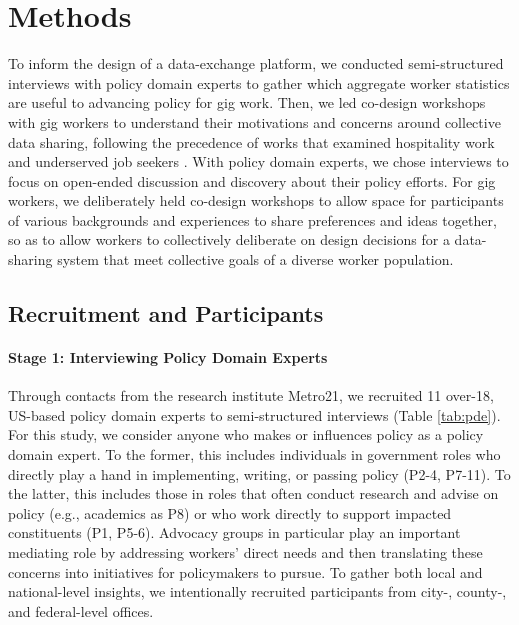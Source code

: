 \section{Methods}\label{h.5sn3xgklbkyx}
To inform the design of a data-exchange platform, we conducted semi-structured interviews with policy domain experts to gather which aggregate worker statistics are useful to advancing policy for gig work. Then, we led co-design workshops with gig workers to understand their motivations and concerns around collective data sharing, {following the precedence of works that examined hospitality work and underserved job seekers \cite{dillahunt2018designing, spektor2023designing}.} {With policy domain experts, we chose interviews to focus on open-ended discussion and discovery about their policy efforts. 
For gig workers, we deliberately held co-design workshops to allow space for participants of various backgrounds and experiences to share preferences and ideas together, so as to allow workers to collectively deliberate on design decisions for a data-sharing system that meet collective goals of a diverse worker population.}
\subsection{Recruitment and Participants}
\label{h.kvn6j5yejjmz}

\paragraph{Stage 1: Interviewing Policy Domain Experts}\label{h.pu0gzew4e1gn}
{Through contacts from the research institute Metro21, w}e recruited 11 over-18, US-based policy domain experts to semi-structured interviews (Table \ref{tab:pde}). For this study, we consider anyone who makes or influences policy as a policy domain expert. 
%
{To the former, this includes individuals in government roles who directly play a hand in implementing, writing, or passing policy (P2-4, P7-11). To the latter, this includes those in roles that often conduct research and advise on policy (e.g., academics as P8) or who work directly to support impacted constituents (P1, P5-6). Advocacy groups in particular play an important mediating role by addressing workers' direct needs and then translating these concerns into initiatives for policymakers to pursue.}
%
{To gather both local and national-level insights, we intentionally recruited participants from city-, county-, and federal-level offices.}



